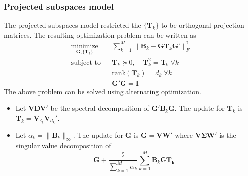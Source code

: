 \documentclass[professionalfonts,hyperref={pdfpagelabels=false,colorlinks=true,linkcolor=cyan}]{beamer}
\begin{document}
\begin{frame}
  \frametitle{Projected subspaces model}
  The projected subspaces model restricted the $\{\mathbf{T}_k\}$ to
  be orthogonal projection matrices. The resulting optimization
  problem can be written as
  \begin{equation}
  \label{eq:5}
	\begin{aligned}
	& \underset{\mathbf{G}, \{\mathbf{T}_k\}}{\text{minimize}}
	& & \sum_{k=1}^{M} \| \mathbf{B}_k - \mathbf{G}
\mathbf{T}_k \mathbf{G}' \|_F^2 \\
	& \text{subject to}
	& & \mathbf{T}_k \succeq 0, \quad \mathbf{T}_k^2 = \mathbf{T}_k \;
    \forall k\\
    & & & \mathrm{rank}(\mathbf{T}_k) = d_k \; \forall k \\
	&&& \mathbf{G}' \mathbf{G} = \mathbf{I}
	\end{aligned}
\end{equation}
The above problem can be solved using alternating
optimization.
\begin{itemize}
\item Let $\mathbf{V} \mathbf{D} \mathbf{V}'$ be the spectral
  decomposition of $\mathbf{G}' \mathbf{B}_k \mathbf{G}$. The update
  for $\mathbf{T}_k$ is $\mathbf{T}_k = \mathbf{V}_{d_k} \mathbf{V}_{d_k}'$.
\item Let $\alpha_k = \| \mathbf{B}_k \|_{\infty}$. The update for
  $\mathbf{G}$ is $\mathbf{G} = \mathbf{V} \mathbf{W}'$
  \cite{kiers90:_major} where $\mathbf{V} \bm{\Sigma} \mathbf{W}'$ is
  the singular value decomposition of
  \begin{equation}
    \label{eq:3}
    \mathbf{G} + \frac{2}{\sum_{k=1}^{M} \alpha_k} \sum_{k=1}^{M}
    \mathbf{B}_k \mathbf{G} \mathbf{T_k}
  \end{equation}
\end{itemize}
\end{frame}
\end{document}
